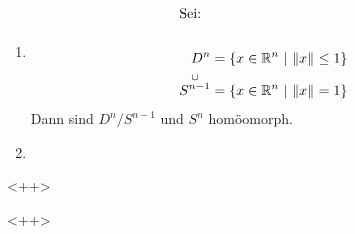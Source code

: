 \begin{bsps}[Quotienten]
    \begin{enumerate}
        \item
            \begin{align}
                \intertext{Sei:} \\
                D^n &= \mdef[x\in\R^n]{\norm{x}\leq 1} \\
                \overset{\cup}{S^{n-1}} &= \mdef[x\in\R^n]{\norm{x} = 1}
            \end{align}
            Dann sind $D^n/S^{n-1}$ und $S^n$ homöomorph.
        \item 
    \end{enumerate}<++>
\end{bsps}<++>
